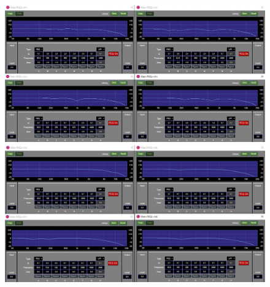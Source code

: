 \documentclass[11pt,a4j]{jreport}
\begin{document}
\begin{figure}[H]
  \begin{minipage}[b]{.5\linewidth}
    \centering
    \includegraphics[width=.9\linewidth]{images/experimentField/afcParameters/01alpha/04manualEQ1.jpg}
  \end{minipage}%
  \begin{minipage}[b]{.5\linewidth}
    \centering
    \includegraphics[width=.9\linewidth]{images/experimentField/afcParameters/01alpha/04manualEQ2.jpg}
  \end{minipage}


\end{figure}
\end{document}
